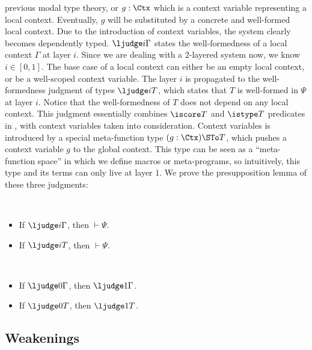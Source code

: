 previous modal type theory, or $g : \Ctx$ which is a context variable representing a local
context. %
Eventually, $g$ will be substituted by a concrete and well-formed local context. %
Due to the introduction of context variables, the system clearly becomes
dependently typed. %
$\ljudge i \Gamma$ states the well-formedness of a local context $\Gamma$ at
layer $i$. %
Since we are dealing with a $2$-layered system now, we know $i \in [0, 1]$. %
The base case of a local context can either be an empty local context, or be
a well-scoped context variable. %
The layer $i$ is propagated to the well-formedness judgment of types $\ljudge i T$,
which states that $T$ is well-formed in $\Psi$ at layer $i$. %
Notice that the well-formedness of $T$ does not depend on any local context. %
This judgment essentially combines $\iscore T$ and $\istype T$
predicates in \citet{hu2024layered}, with context variables taken into consideration. %
Context variables is introduced by a special meta-function type $(g : \Ctx)
\STo T$, which pushes a context variable $g$ to the global context. %
This type can be seen as a ``meta-function space'' in which we define macros or
meta-programs, so intuitively, this type and its terms can only live at layer $1$. %
We prove the presupposition lemma of these three judgments:
\begin{lemma}[Presupposition]$ $
  \begin{itemize}
  \item If $\ljudge i \Gamma$,  then $\vdash \Psi$.
  \item If $\ljudge i T$, then $\vdash \Psi$.
  \end{itemize}
\end{lemma}
\begin{lemma}[Lifting] $ $
  \begin{itemize}
  \item If $\ljudge 0 \Gamma$,  then $\ljudge 1 \Gamma$.
  \item If $\ljudge 0 T$,  then $\ljudge 1 T$.
  \end{itemize}
\end{lemma}

\subsection{Weakenings}

